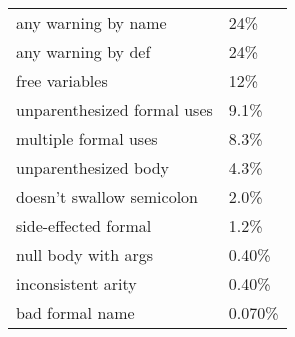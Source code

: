 \begin{tabular}{|l|l|} \hline
any warning by name & 24\% \\ 
any warning by def & 24\% \\ 
free variables & 12\% \\ 
unparenthesized formal uses & 9.1\% \\ 
multiple formal uses & 8.3\% \\ 
unparenthesized body & 4.3\% \\ 
doesn't swallow semicolon & 2.0\% \\ 
side-effected formal & 1.2\% \\ 
null body with args & 0.40\% \\ 
inconsistent arity & 0.40\% \\ 
bad formal name & 0.070\% \\ 
\hline
\end{tabular}
